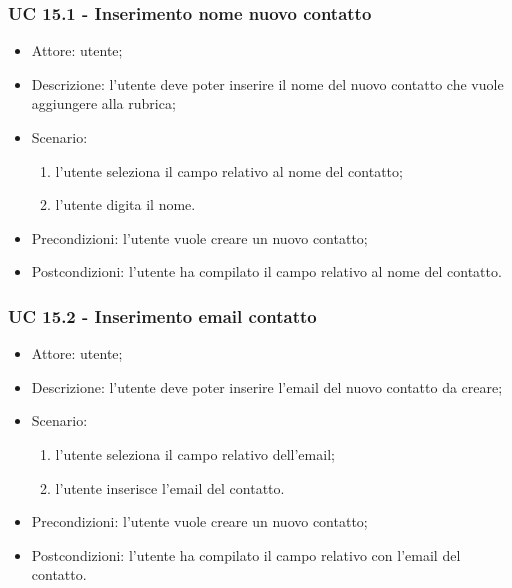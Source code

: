 \subsubsection{UC 15.1 - Inserimento nome nuovo contatto} \label{sec: UC 15.1}
\begin{itemize}
    \item Attore: utente;
    \item Descrizione: l'utente deve poter inserire il nome del nuovo contatto che vuole aggiungere alla rubrica;
    \item Scenario:
        \begin{enumerate}
        \item l'utente seleziona il campo relativo al nome del contatto;
        \item l'utente digita il nome.
        \end{enumerate}
    
    \item Precondizioni: l'utente vuole creare un nuovo contatto;
    \item Postcondizioni: l'utente ha compilato il campo relativo al nome del contatto.
\end{itemize}


\subsubsection{UC 15.2 - Inserimento email contatto} \label{sec: UC 15.2}
\begin{itemize}
    \item Attore: utente;
    \item Descrizione: l'utente deve poter inserire l'email del nuovo contatto da creare;
    \item Scenario:
        \begin{enumerate}
        \item l'utente seleziona il campo relativo dell'email;
        \item l'utente inserisce l'email del contatto.
        \end{enumerate}
    
    \item Precondizioni: l'utente vuole creare un nuovo contatto;
    \item Postcondizioni: l'utente ha compilato il campo relativo con l'email del contatto.
\end{itemize}


